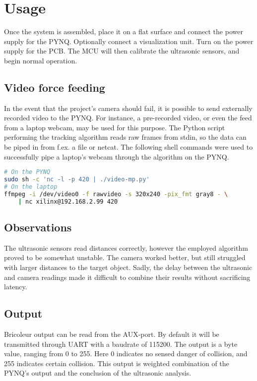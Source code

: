 
\section{Usage}
Once the system is assembled, place it on a flat surface and connect the power supply for the PYNQ. Optionally connect a visualization unit. Turn on the power supply for the PCB. The MCU will then calibrate the ultrasonic sensors, and begin normal operation.

\subsection{Video force feeding}
In the event that the project's camera should fail, it is possible to send externally recorded video to the PYNQ. For instance, a pre-recorded video, or even the feed from a laptop webcam, may be used for this purpose. The Python script performing the tracking algorithm reads raw frames from stdin, so the data can be piped in from f.ex. a file or netcat. The following shell commands were used to successfully pipe a laptop's webcam through the algorithm on the PYNQ.

\lstset{basicstyle=\footnotesize}
\begin{lstlisting}[language=bash]
# On the PYNQ
sudo sh -c 'nc -l -p 420 | ./video-mp.py'
# On the laptop
ffmpeg -i /dev/video0 -f rawvideo -s 320x240 -pix_fmt gray8 - \
    | nc xilinx@192.168.2.99 420
\end{lstlisting}

\subsection{Observations}


The ultrasonic sensors read distances correctly, however the employed algorithm proved to be somewhat unstable. The camera worked better, but still struggled with larger distances to the target object. Sadly, the delay between the ultrasonic and camera readings made it difficult to combine their results without sacrificing latency. 

\subsection{Output}
Bricoleur output can be read from the AUX-port. By default it will be transmitted through UART with a baudrate of 115200. The output is a byte value, ranging from 0 to 255. Here 0 indicates no sensed danger of collision, and 255 indicates certain collision. This output is weighted combination of the PYNQ's output and the conclusion of the ultrasonic analysis. 

